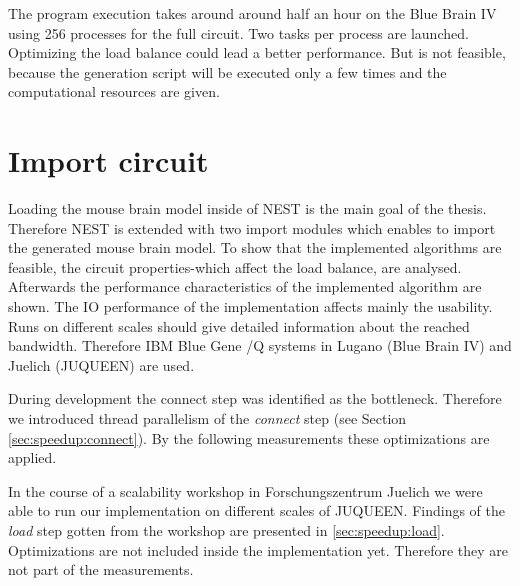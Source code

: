 The program execution takes around around half an hour on the Blue Brain IV using 256 processes for the full circuit.
Two tasks per process are launched. Optimizing the load balance could lead a better performance.
But is not feasible, because the generation script will be executed only a few times
and the computational resources are given.

\section{Import circuit}
Loading the mouse brain model inside of NEST is the main goal of the thesis.
Therefore NEST is extended with two import modules which enables to import the
generated mouse brain model. To show that the implemented algorithms are feasible, 
the circuit properties-which affect the load balance, are analysed.
Afterwards the performance characteristics of the implemented algorithm are shown.
The IO performance of the implementation affects mainly the usability.
Runs on different scales should give detailed information about the reached bandwidth.
Therefore IBM Blue Gene /Q systems in Lugano (Blue Brain IV) and Juelich (JUQUEEN) are used.

During development the connect step was identified as the bottleneck.
Therefore we introduced thread parallelism of the \emph{connect} step (see Section \ref{sec:speedup:connect}).
By the following measurements these optimizations are applied.

In the course of a scalability workshop in Forschungszentrum Juelich we were able to run
our implementation on different scales of JUQUEEN.
Findings of the \emph{load} step gotten from the workshop are presented in \ref{sec:speedup:load}.
Optimizations are not included inside the implementation yet.
Therefore they are not part of the measurements.

